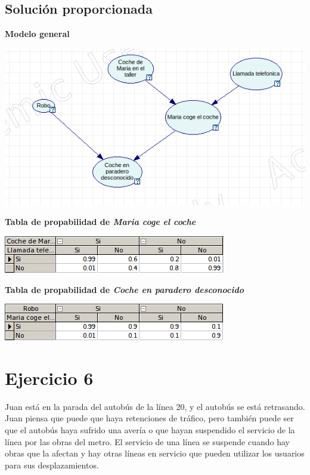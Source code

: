 \documentclass{article}
\begin{document}
\newpage

\subsection{Solución proporcionada}

\textbf{Modelo general}

\begin{center}
\includegraphics[scale=0.5]{Modelo5.png}
\end{center}

\textbf{Tabla de propabilidad de \textit{Maria coge el coche}}

\begin{center}
\includegraphics[scale=0.5]{MariaCoche.png}
\end{center}

\textbf{Tabla de propabilidad de \textit{Coche en paradero desconocido}}

\begin{center}
\includegraphics[scale=0.5]{CocheDesaparecido.png}
\end{center}

\section{Ejercicio 6}

Juan está en la parada del autobús de la línea 20, y el autobús se está retrasando. Juan piensa que puede que haya retenciones de tráfico, pero también puede ser que el autobús haya sufrido una avería o que hayan suspendido el servicio de la línea por las obras del metro. El servicio de una línea se suspende cuando hay obras que la afectan y hay otras líneas en servicio que pueden utilizar los usuarios para sus desplazamientos.
\end{document}
